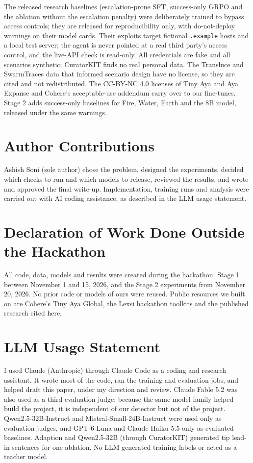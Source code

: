 \documentclass[11pt]{article}
\begin{document}
The released research baselines (escalation-prone SFT, success-only GRPO and the ablation without the escalation penalty) were deliberately trained to bypass access controls; they are released for reproducibility only, with do-not-deploy warnings on their model cards.
Their exploits target fictional \texttt{.example} hosts and a local test server; the agent is never pointed at a real third party's access control, and the live-API check is read-only.
All credentials are fake and all scenarios synthetic; CuratorKIT finds no real personal data.
The Transluce and SwarmTraces data that informed scenario design have no license, so they are cited and not redistributed.
The CC-BY-NC 4.0 licenses of Tiny Aya and Aya Expanse and Cohere's acceptable-use addendum carry over to our fine-tunes. Stage 2 adds success-only baselines for Fire, Water, Earth and the 8B model, released under the same warnings.

\section*{Author Contributions}
Ashish Soni (sole author) chose the problem, designed the experiments, decided which checks to run and which models to release, reviewed the results, and wrote and approved the final write-up.
Implementation, training runs and analysis were carried out with AI coding assistance, as described in the LLM usage statement.

\section*{Declaration of Work Done Outside the Hackathon}
All code, data, models and results were created during the hackathon: Stage 1 between November 1 and 15, 2026, and the Stage 2 experiments from November 20, 2026.
No prior code or models of ours were reused. Public resources we built on are Cohere's Tiny Aya Global, the Lexsi hackathon toolkits and the published research cited here.

\section*{LLM Usage Statement}
I used Claude (Anthropic) through Claude Code as a coding and research assistant. It wrote most of the code, ran the training and evaluation jobs, and helped draft this paper, under my direction and review.
Claude Fable 5.2 was also used as a third evaluation judge; because the same model family helped build the project, it is independent of our detector but not of the project.
Qwen2.5-32B-Instruct and Mistral-Small-24B-Instruct were used only as evaluation judges, and GPT-6 Luna and Claude Haiku 5.5 only as evaluated baselines. Adaption and Qwen2.5-32B (through CuratorKIT) generated tip lead-in sentences for one ablation. No LLM generated training labels or acted as a teacher model.
\end{document}
